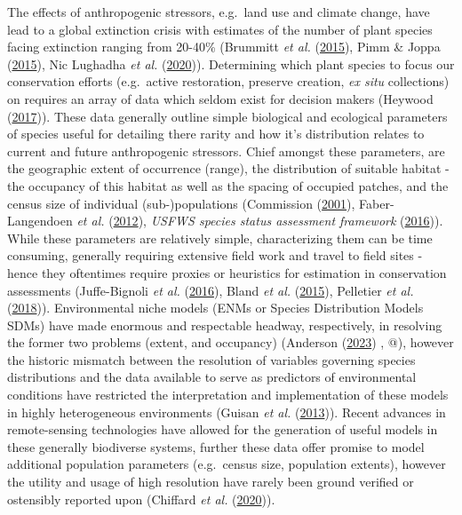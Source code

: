 \documentclass[
]{article}
\begin{document}
The effects of anthropogenic stressors, e.g.~land use and climate
change, have lead to a global extinction crisis with estimates of the
number of plant species facing extinction ranging from 20-40\% (Brummitt
\emph{et al.} (\protect\hyperlink{ref-brummitt2015green}{2015}), Pimm \&
Joppa (\protect\hyperlink{ref-pimm2015many}{2015}), Nic Lughadha
\emph{et al.} (\protect\hyperlink{ref-nic2020extinction}{2020})).
Determining which plant species to focus our conservation efforts
(e.g.~active restoration, preserve creation, \emph{ex situ} collections)
on requires an array of data which seldom exist for decision makers
(Heywood (\protect\hyperlink{ref-heywood2017plant}{2017})). These data
generally outline simple biological and ecological parameters of species
useful for detailing there rarity and how it's distribution relates to
current and future anthropogenic stressors. Chief amongst these
parameters, are the geographic extent of occurrence (range), the
distribution of suitable habitat - the occupancy of this habitat as well
as the spacing of occupied patches, and the census size of individual
(sub-)populations (Commission
(\protect\hyperlink{ref-natural2001iucn}{2001}), Faber-Langendoen
\emph{et al.} (\protect\hyperlink{ref-faber2012natureserve}{2012}),
\emph{USFWS species status assessment framework}
(\protect\hyperlink{ref-usfws2016ssa}{2016})). While these parameters
are relatively simple, characterizing them can be time consuming,
generally requiring extensive field work and travel to field sites -
hence they oftentimes require proxies or heuristics for estimation in
conservation assessments (Juffe-Bignoli \emph{et al.}
(\protect\hyperlink{ref-juffe2016assessing}{2016}), Bland \emph{et al.}
(\protect\hyperlink{ref-bland2015cost}{2015}), Pelletier \emph{et al.}
(\protect\hyperlink{ref-pelletier2018predicting}{2018})). Environmental
niche models (ENMs or Species Distribution Models SDMs) have made
enormous and respectable headway, respectively, in resolving the former
two problems (extent, and occupancy) (Anderson
(\protect\hyperlink{ref-anderson2023integrating}{2023}) , @), however
the historic mismatch between the resolution of variables governing
species distributions and the data available to serve as predictors of
environmental conditions have restricted the interpretation and
implementation of these models in highly heterogeneous environments
(Guisan \emph{et al.}
(\protect\hyperlink{ref-guisan2013predicting}{2013})). Recent advances
in remote-sensing technologies have allowed for the generation of useful
models in these generally biodiverse systems, further these data offer
promise to model additional population parameters (e.g.~census size,
population extents), however the utility and usage of high resolution
have rarely been ground verified or ostensibly reported upon (Chiffard
\emph{et al.} (\protect\hyperlink{ref-chiffard2020anbs}{2020})).
\end{document}
